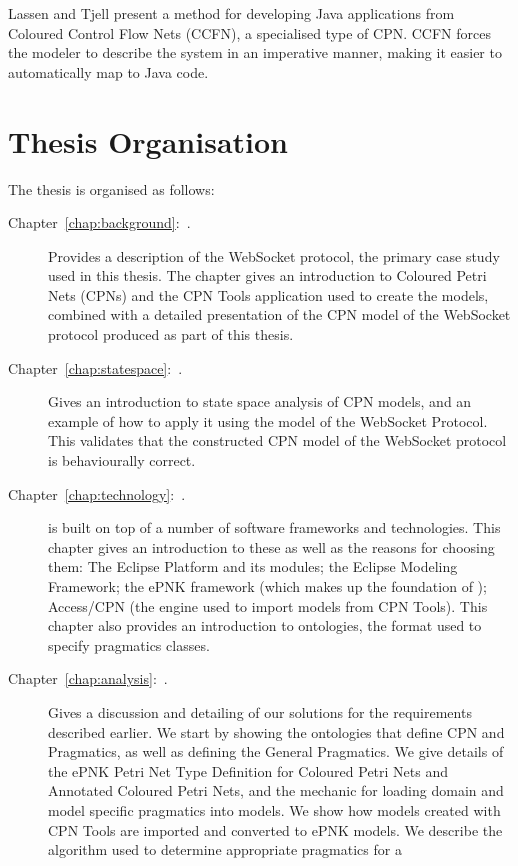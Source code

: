 Lassen and Tjell \cite{lassen2010automatic}  present a method for developing
Java applications from Coloured Control Flow Nets (CCFN), a specialised type of
CPN. CCFN forces the modeler to describe the system in an
imperative manner, making it easier to automatically map to Java code.

\section{Thesis Organisation}
The thesis is organised as follows:

\begin{description}
\item[Chapter~\ref{chap:background}:~.] Provides a
description of the WebSocket protocol, the primary case study used in this
thesis. The chapter gives an introduction to Coloured Petri Nets (CPNs) and the
CPN Tools application used to create the models, combined with a detailed
presentation of the CPN model of the WebSocket protocol produced as part of this
thesis.
\item[Chapter~\ref{chap:statespace}:~.] Gives an
introduction to state space analysis of CPN models, and an example of how to
apply it using the model of the WebSocket Protocol. This validates that the
constructed CPN model of the WebSocket protocol is behaviourally correct.
\item [Chapter~\ref{chap:technology}:~.] \thename{} is built
on top of a number of software frameworks and technologies.
This chapter gives an introduction to these as well as the reasons for choosing
them: The Eclipse Platform and its modules; the Eclipse Modeling Framework; the ePNK
framework (which makes up the foundation of \thename{}); Access/CPN (the engine
used to import models from CPN Tools). This chapter also provides an
introduction to ontologies, the format used to specify pragmatics classes.
\item [Chapter~\ref{chap:analysis}:~.] Gives a
discussion and detailing of our solutions for the requirements described
earlier. We start by showing the ontologies that define CPN and Pragmatics, as
well as defining the General Pragmatics. We give details of the ePNK Petri Net
Type Definition for Coloured Petri Nets and Annotated Coloured Petri Nets, and
the mechanic for loading domain and model specific pragmatics into
models. We show how models created with CPN Tools are imported and converted to
ePNK models.
We describe the algorithm used to determine appropriate pragmatics for a

\end{description}
